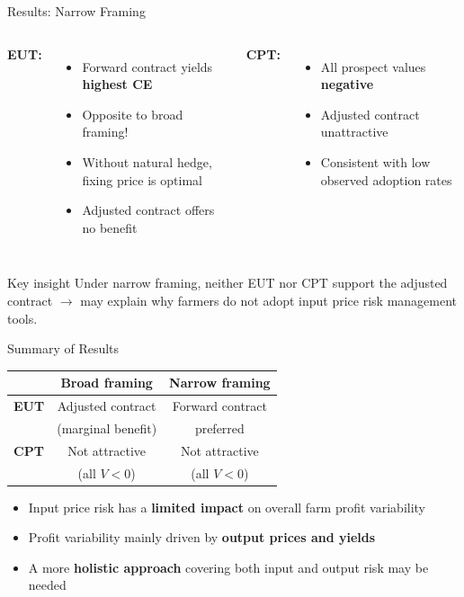 \documentclass[aspectratio=169,12pt]{beamer}
\begin{document}
\begin{frame}{Results: Narrow Framing}
\begin{columns}[T]
\textbf{EUT:}
\begin{itemize}
    \item Forward contract yields \textbf{highest CE}
    \item Opposite to broad framing!
    \item Without natural hedge, fixing price is optimal
    \item Adjusted contract offers no benefit
\end{itemize}

\textbf{CPT:}
\begin{itemize}
    \item All prospect values \textbf{negative}
    \item Adjusted contract unattractive
    \item Consistent with low observed adoption rates
\end{itemize}
\end{columns}

\vspace{1em}
\begin{alertblock}{Key insight}
Under narrow framing, neither EUT nor CPT support the adjusted contract $\rightarrow$ may explain why farmers do not adopt input price risk management tools.
\end{alertblock}
\end{frame}

\begin{frame}{Summary of Results}
\begin{table}
\centering
\begin{tabular}{lcc}
\toprule
 & Broad framing & Narrow framing \\
\midrule
\textbf{EUT} & Adjusted contract & Forward contract \\
 & (marginal benefit) & preferred \\
\midrule
\textbf{CPT} & Not attractive & Not attractive \\
 & (all $V < 0$) & (all $V < 0$) \\
\bottomrule
\end{tabular}
\end{table}

\vspace{0.5em}
\begin{itemize}
    \item Input price risk has a \textbf{limited impact} on overall farm profit variability
    \item Profit variability mainly driven by \textbf{output prices and yields}
    \item A more \textbf{holistic approach} covering both input and output risk may be needed
\end{itemize}
\end{frame}
\end{document}
